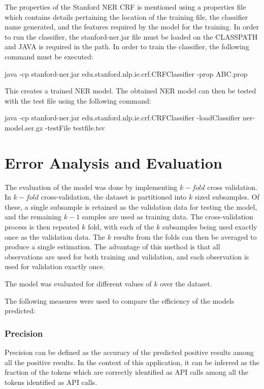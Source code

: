 \documentclass{sig-alternate-05-2015}
\begin{document}
The properties of the Stanford NER CRF is mentioned using a properties file which contains details pertaining the location of the training file, the classifier name generated, and the features required by the model for the training. In order to run the classifier, the stanford-ner.jar file must be loaded on the CLASSPATH and JAVA is required in the path. In order to train the classifier, the following command must be executed: 

\begin{description}
\item 
java -cp stanford-ner.jar edu.stanford.nlp.ie.crf.CRFClassifier -prop ABC.prop
\end{description}
This creates a trained NER model. The obtained NER model can then be tested with the test file using the following command: 
\begin{description}
\item
java -cp stanford-ner.jar edu.stanford.nlp.ie.crf.CRFClassifier -loadClassifier ner-model.ser.gz -testFile testfile.tsv
\end{description}

\section{Error Analysis and Evaluation}
The evaluation of the model was done by implementing $k-fold$ cross validation. In $k-fold$ cross-validation, the dataset is partitioned into $k$ sized subsamples. Of these, a single subsample is retained as the validation data for testing the model, and the remaining $k − 1$ samples are used as training data. The cross-validation process is then repeated $k$ fold, with each of the $k$ subsamples being used exactly once as the validation data. The $k$ results from the folds can then be averaged to produce a single estimation. The advantage of this method is that all observations are used for both training and validation, and each observation is used for validation exactly once. 

The model was evaluated for different values of $k$ over the dataset.

The following measures were used to compare the efficiency of the models predicted:

\subsubsection{Precision}
Precision can be defined as the accuracy of the predicted positive results among all the positive results. In the context of this application, it can be inferred as the fraction of the tokens which are correctly identified as API calls among all the tokens identified as API calls.
\end{document}
